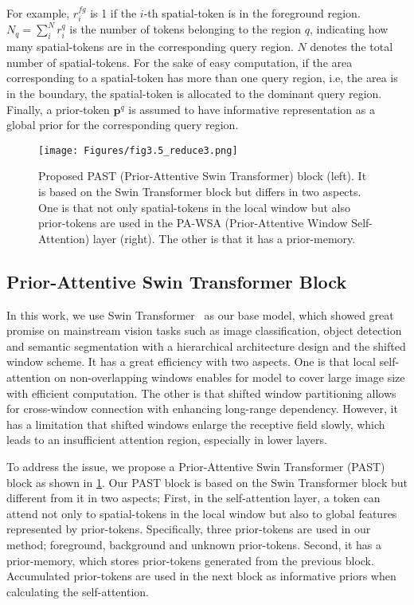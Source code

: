 \documentclass[10pt,twocolumn,letterpaper]{article}
\begin{document}
For example, $r_{i}^{fg}$ is 1 if the $i$-th spatial-token is in the foreground region. $N_{q} = \sum_{i}^N r_i^q$ is the number of tokens belonging to the region $q$, indicating how many spatial-tokens are in the corresponding query region. $N$ denotes the total number of spatial-tokens.
For the sake of easy computation, if the area corresponding to a spatial-token has more than one query region, i.e, the area is in the boundary, the spatial-token is allocated to the dominant query region.
Finally, a prior-token $\mathbf{p}^q$ is assumed to have informative representation as a global prior for the corresponding query region.

\begin{figure}[t]
  \begin{center}
  \texttt{[image: Figures/fig3.5\_reduce3.png]}      
  \end{center}
  \vspace{-5mm}
  \caption{Proposed PAST (Prior-Attentive Swin Transformer) block (left). It is based on the Swin Transformer block but differs in two aspects. One is that not only spatial-tokens in the local window but also prior-tokens are used in the PA-WSA (Prior-Attentive Window Self-Attention) layer (right). The other is that it has a prior-memory.}
  \label{fig:PAST}
\end{figure}

\subsection{Prior-Attentive Swin Transformer Block}
\label{sec:PAST}

In this work, we use Swin Transformer~\cite{liu2021swin} as our base model, which showed great promise on mainstream vision tasks such as image classification, object detection and semantic segmentation with a hierarchical architecture design and the shifted window scheme. It has a great efficiency with two aspects. One is that local self-attention on non-overlapping windows enables for model to cover large image size with efficient computation. The other is that shifted window partitioning allows for cross-window connection with enhancing long-range dependency.
However, it has a limitation that shifted windows enlarge the receptive field slowly, which leads to an insufficient attention region, especially in lower layers.

To address the issue, we propose a Prior-Attentive Swin Transformer (PAST) block as shown in \cref{fig:PAST}. Our PAST block is based on the Swin Transformer block but different from it in two aspects; 
First, in the self-attention layer, a token can attend not only to spatial-tokens in the local window but also to global features represented by prior-tokens. Specifically, three prior-tokens are used in our method; foreground, background and unknown prior-tokens. Second, it has a prior-memory, which stores prior-tokens generated from the previous block. Accumulated prior-tokens are used in the next block as informative priors when calculating the self-attention.
\end{document}
